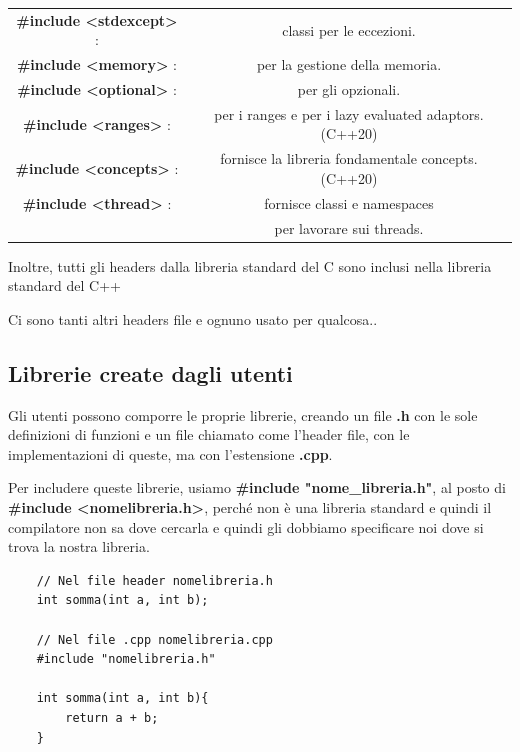 \begin{tabular}{cc}
	\textbf{\#include <stdexcept>} : & \textsf{\small classi per le eccezioni.} \\
	\textbf{\#include <memory>} : & \textsf{\small per la gestione della memoria.} \\
	\textbf{\#include <optional>} : & \textsf{\small per gli opzionali.} \\
	\textbf{\#include <ranges>} : & \textsf{\small per i ranges e per i lazy evaluated adaptors. (C++20)} \\
	\textbf{\#include <concepts>} : & \textsf{\small fornisce la libreria fondamentale concepts. (C++20)} \\
	\textbf{\#include <thread>} : & \textsf{\small fornisce classi e namespaces } \\
	\textbf{} & \textsf{per lavorare sui threads.} \\
\end{tabular} \break

\textsf{\small Inoltre, tutti gli headers dalla libreria standard del C sono inclusi nella libreria standard del C++}

\textsf{\small Ci sono tanti altri headers file e ognuno usato per qualcosa..} \\

\subsection{Librerie create dagli utenti}

\textsf{\small Gli utenti possono comporre le proprie librerie, creando un file \textbf{.h} con le sole definizioni di funzioni e un file chiamato come l'header file, con le implementazioni di queste, ma con l'estensione \textbf{.cpp}.}

\textsf{\small Per includere queste librerie, usiamo \textbf{\#include "nome\_libreria.h"}, al posto di \textbf{\#include <nomelibreria.h>}, perché non è una libreria standard e quindi il compilatore non sa dove cercarla e quindi gli dobbiamo specificare noi dove si trova la nostra libreria.} \\

\begin{lstlisting}
	// Nel file header nomelibreria.h
	int somma(int a, int b);
	
	// Nel file .cpp nomelibreria.cpp
	#include "nomelibreria.h"
	
	int somma(int a, int b){
		return a + b;
	}
\end{lstlisting}

